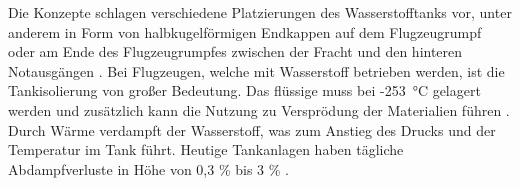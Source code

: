 Die Konzepte schlagen verschiedene Platzierungen des Wasserstofftanks vor, unter anderem in Form von halbkugelförmigen Endkappen auf dem Flugzeugrumpf \cite{dahal2021techno} 
oder am Ende des Flugzeugrumpfes zwischen der Fracht und den hinteren Notausgängen \cite{rietdijk2024architecture}.
Bei Flugzeugen, welche mit Wasserstoff betrieben werden, ist die Tankisolierung von großer Bedeutung. 
Das flüssige  muss bei -253 °C gelagert werden \cite{colpan2022fuel} 
und zusätzlich kann die Nutzung zu Versprödung der Materialien führen \cite{dahal2021techno}.
Durch Wärme verdampft der Wasserstoff, was zum Anstieg des Drucks und der Temperatur im Tank führt. Heutige Tankanlagen 
haben tägliche Abdampfverluste in Höhe von 0,3 \% bis 3 \% \cite{eichlseder2012hydrogen}.\\

%
%
%

